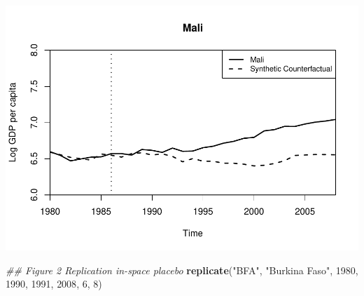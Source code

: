 \documentclass[]{article}
\newenvironment{Shaded}{\begin{snugshade}}{\end{snugshade}}
\newcommand{\CommentTok}[1]{\textcolor[rgb]{0.56,0.35,0.01}{\textit{#1}}}
\newcommand{\DecValTok}[1]{\textcolor[rgb]{0.00,0.00,0.81}{#1}}
\newcommand{\KeywordTok}[1]{\textcolor[rgb]{0.13,0.29,0.53}{\textbf{#1}}}
\newcommand{\NormalTok}[1]{#1}
\newcommand{\StringTok}[1]{\textcolor[rgb]{0.31,0.60,0.02}{#1}}
\begin{document}
\includegraphics{ProjectNotebook_files/figure-latex/unnamed-chunk-5-1.pdf}

\begin{Shaded}
\begin{Highlighting}[]
\CommentTok{## Figure 2 Replication in-space placebo}
\KeywordTok{replicate}\NormalTok{(}\StringTok{"BFA"}\NormalTok{, }\StringTok{"Burkina Faso"}\NormalTok{, }\DecValTok{1980}\NormalTok{, }\DecValTok{1990}\NormalTok{, }\DecValTok{1991}\NormalTok{, }\DecValTok{2008}\NormalTok{, }\DecValTok{6}\NormalTok{, }\DecValTok{8}\NormalTok{)  }
\end{Highlighting}
\end{Shaded}
\end{document}

